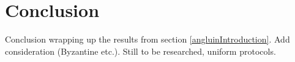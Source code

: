 \section{Conclusion} 

Conclusion wrapping up the results from section \ref{angluinIntroduction}. Add consideration (Byzantine  etc.). 
Still to be researched, uniform protocols. 
\clearpage
